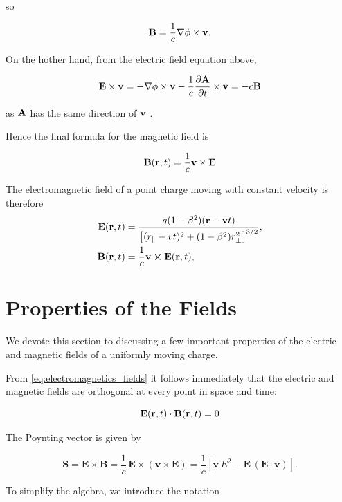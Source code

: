 \documentclass[12pt]{article}
\begin{document}
so

\[
  {\vb B} =\frac{1}{c}\nabla\phi\times\vb v.
\]

On the hother hand, from the electric field equation above,

\[
  \vb E \times{\vb v}
  =
  -\nabla\phi\times{\vb v}
  -
  \frac{1}{c}
  \frac{\partial\vb A}{\partial t}\times{\vb v} = -c {\vb B}
\]

as $\vb A$ has the same direction of $\vb v$ .

Hence the final formula for the magnetic field is

\begin{equation}
  \vb B(\vb r,t)
  =
   \frac{1}{c} {\vb v} \times {\vb E}
  \label{eq:magnetic_field_uniform_motion}
\end{equation}


The electromagnetic field of a point charge moving with constant velocity is
therefore
\begin{align}
  \vb{E}(\vb{r},t)
  &=
  \frac{
    q(1-\beta^2)(\vb{r}-\vb{v}t)
  }{
    \left[
      (r_\parallel-vt)^2
      +
      (1-\beta^2)r_\perp^2
    \right]^{3/2}
  },
  \\
  \vb{B}(\vb{r},t)
  &=
  \frac{1}{c}\vb{v}\cross\vb{E}(\vb{r},t),
  \label{eq:electromagnetics_fields}
\end{align}

\section{Properties of the Fields}

We devote this section to discussing a few important properties of the electric and magnetic fields of a uniformly moving charge.

From \eqref{eq:electromagnetics_fields} it follows immediately that the electric and
magnetic fields are orthogonal at every point in space and time:

\[
  \vb{E}(\vb{r},t) \cdot  \vb{B}(\vb{r},t) =0
\]

The Poynting vector is given by

\[
\mathbf S
=
\mathbf E\times\mathbf B
=
\frac{1}{c}\,
\mathbf E\times
(\mathbf v\times\mathbf E)
=
\frac{1}{c}
\left[
\mathbf v\,E^2
-
\mathbf E\,(\mathbf E\cdot\mathbf v)
\right].
\]

To simplify the algebra, we introduce the notation
\end{document}
